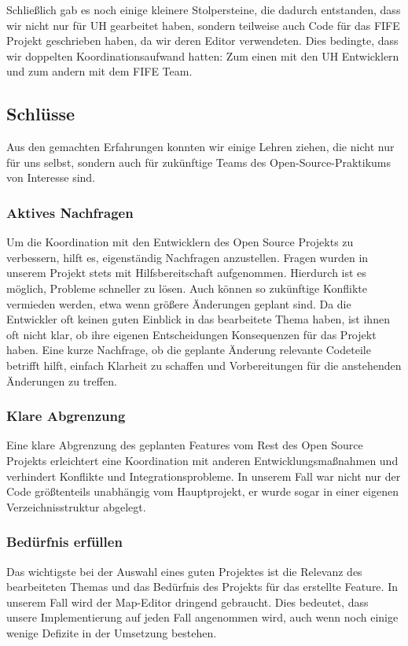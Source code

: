 Schließlich gab es noch einige kleinere Stolpersteine, die dadurch entstanden,
dass wir nicht nur für UH gearbeitet haben, sondern teilweise auch Code
für das FIFE Projekt geschrieben haben, da wir deren Editor verwendeten.
Dies bedingte, dass wir doppelten Koordinationsaufwand hatten: Zum einen mit
den UH Entwicklern und zum andern mit dem FIFE Team.

\subsection{Schlüsse}
Aus den gemachten Erfahrungen konnten wir einige Lehren ziehen, die nicht nur
für uns selbst, sondern auch für zukünftige Teams des Open-Source-Praktikums
von Interesse sind.

\subsubsection{Aktives Nachfragen}
Um die Koordination mit den Entwicklern des Open Source Projekts zu verbessern,
hilft es, eigenständig Nachfragen anzustellen. Fragen wurden in
unserem Projekt stets mit Hilfsbereitschaft aufgenommen. Hierdurch ist es möglich,
Probleme schneller zu lösen. Auch können so zukünftige Konflikte vermieden werden,
etwa wenn größere Änderungen geplant sind. Da die Entwickler oft keinen guten
Einblick in das bearbeitete Thema haben, ist ihnen oft nicht klar, ob ihre eigenen
Entscheidungen Konsequenzen für das Projekt haben. Eine kurze Nachfrage, ob die
geplante Änderung relevante Codeteile betrifft hilft, einfach Klarheit zu schaffen
und Vorbereitungen für die anstehenden Änderungen zu treffen.

\subsubsection{Klare Abgrenzung}
Eine klare Abgrenzung des geplanten Features vom Rest des Open Source Projekts
erleichtert eine Koordination mit anderen Entwicklungsmaßnahmen und verhindert
Konflikte und Integrationsprobleme. In unserem Fall war nicht nur der Code
größtenteils unabhängig vom Hauptprojekt, er wurde sogar in einer eigenen
Verzeichnisstruktur abgelegt.

\subsubsection{Bedürfnis erfüllen}
Das wichtigste bei der Auswahl eines guten Projektes ist die Relevanz des
bearbeiteten Themas und das Bedürfnis des Projekts für das erstellte Feature.
In unserem Fall wird der Map-Editor dringend gebraucht. Dies bedeutet, dass
unsere Implementierung auf jeden Fall angenommen wird, auch wenn noch
einige wenige Defizite in der Umsetzung bestehen.

